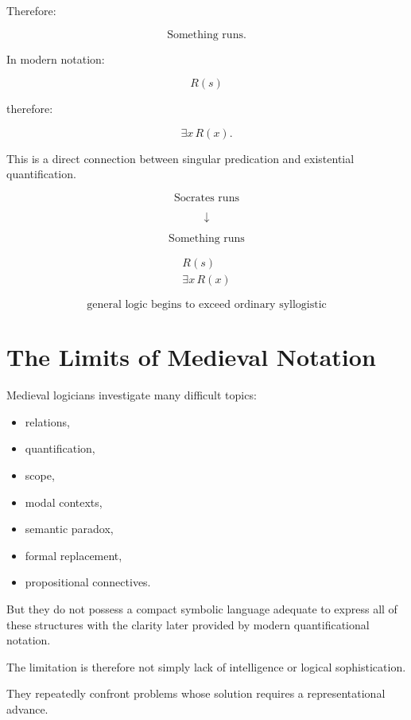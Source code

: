 \documentclass[11pt]{article}
\begin{document}
Therefore:

\[
\text{Something runs.}
\]

In modern notation:

\[
R(s)
\]

therefore:

\[
\exists x\,R(x).
\]

This is a direct connection between singular predication and
existential quantification.

\begin{whiteboard}
\[
\text{Socrates runs}
\]

\[
\downarrow
\]

\[
\text{Something runs}
\]

\[
\begin{array}{c}
R(s)\\
\hline
\exists x\,R(x)
\end{array}
\]

\[
\boxed{\text{general logic begins to exceed ordinary syllogistic}}
\]
\end{whiteboard}

\section{The Limits of Medieval Notation}

Medieval logicians investigate many difficult topics:

\begin{itemize}
    \item relations,
    \item quantification,
    \item scope,
    \item modal contexts,
    \item semantic paradox,
    \item formal replacement,
    \item propositional connectives.
\end{itemize}

But they do not possess a compact symbolic language adequate to
express all of these structures with the clarity later provided by
modern quantificational notation.

The limitation is therefore not simply lack of intelligence or
logical sophistication.

They repeatedly confront problems whose solution requires a
representational advance.
\end{document}
